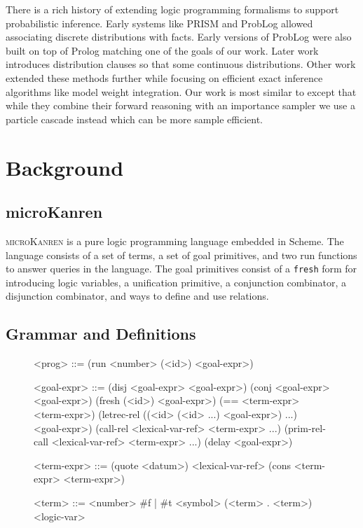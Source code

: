 \documentclass[
]{ceurart}
\begin{document}
There is a rich history of extending logic programming formalisms to
support probabilistic inference. Early systems like
PRISM\cite{sato1997prism} and ProbLog\cite{de2007problog} allowed
associating discrete distributions with facts. Early versions of
ProbLog were also built on top of Prolog matching one of the goals of
our work. Later work\cite{gutmann2010extending} introduces
distribution clauses so that some continuous distributions. Other work
extended these methods further while focusing on efficient exact
inference algorithms like model weight
integration\cite{islam2012inference, belle2015probabilistic}. Our work
is most similar to \cite{gutmann2011magic} except that while they
combine their forward reasoning with an importance sampler we use a
particle cascade instead which can be more sample efficient.

\section{Background}

\subsection{microKanren}

\textsc{microKanren}\cite{10.1145/2989225.2989230, daniel2018reasoned}
is a pure logic programming language embedded in Scheme. The language
consists of a set of terms, a set of goal primitives, and two run
functions to answer queries in the language. The goal primitives
consist of a \texttt{fresh} form for introducing logic variables, a
unification primitive, a conjunction combinator, a disjunction
combinator, and ways to define and use relations.

\subsection{Grammar and Definitions}

\begin{figure}
\begin{grammar}
<prog> ::= (run <number> (<id>) <goal-expr>)

<goal-expr> ::= (disj <goal-expr> <goal-expr>) \alt
	        (conj <goal-expr> <goal-expr>) \alt
                (fresh (<id>) <goal-expr>) \alt
		(== <term-expr> <term-expr>) \alt
		(letrec-rel ((<id> (<id> ...) <goal-expr>) ...) \\
		\hspace{\grammarindent} <goal-expr>) \alt
		(call-rel <lexical-var-ref> <term-expr> ...) \alt
		(prim-rel-call <lexical-var-ref> <term-expr> ...) \alt
		(delay <goal-expr>)

<term-expr> ::= (quote <datum>) \alt
                <lexical-var-ref> \alt
                (cons <term-expr> <term-expr>)

<term> ::= <number> \alt
           \#f | \#t \alt
	   <symbol> \alt
	   (<term> . <term>) \alt
	   <logic-var>

\end{grammar}
\end{figure}
\end{document}
